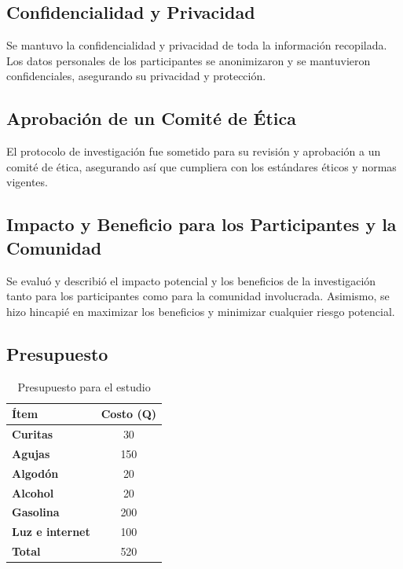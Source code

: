\documentclass[man]{apa7}
\begin{document}
	\subsection{Confidencialidad y Privacidad}\label{confidencialidad-y-privacidad}

	Se mantuvo la confidencialidad y privacidad de toda la información
	recopilada. Los datos personales de los participantes se anonimizaron y se
	mantuvieron confidenciales, asegurando su privacidad y
	protección.

	\subsection{Aprobación de un Comité de Ética}\label{aprobaciuxf3n-de-un-comituxe9-de-uxe9tica}

	El protocolo de investigación fue sometido para su revisión y
	aprobación a un comité de ética, asegurando así que cumpliera con los
	estándares éticos y normas vigentes.

	\subsection{Impacto y Beneficio para los Participantes y la Comunidad}\label{impacto-y-beneficio-para-los-participantes-y-la-comunidad}

	Se evaluó y describió el impacto potencial y los beneficios de la
	investigación tanto para los participantes como para la comunidad
	involucrada. Asimismo, se hizo hincapié en maximizar los beneficios y
	minimizar cualquier riesgo potencial.

	\subsection{Presupuesto}\label{presupuesto}

	\begin{table}[H]
		\centering
		\begin{tabular}{>{\bfseries}l c}
			\toprule
			Ítem & Costo (Q) \\

			\midrule
			Curitas & 30 \\

			Agujas & 150 \\

			Algodón & 20 \\

			Alcohol & 20 \\

			Gasolina & 200 \\

			Luz e internet & 100 \\

			\midrule
			Total & 520 \\

			\bottomrule
		\end{tabular}
		\caption{Presupuesto para el estudio}
		\label{tab:presupuesto}
	\end{table}
\end{document}
